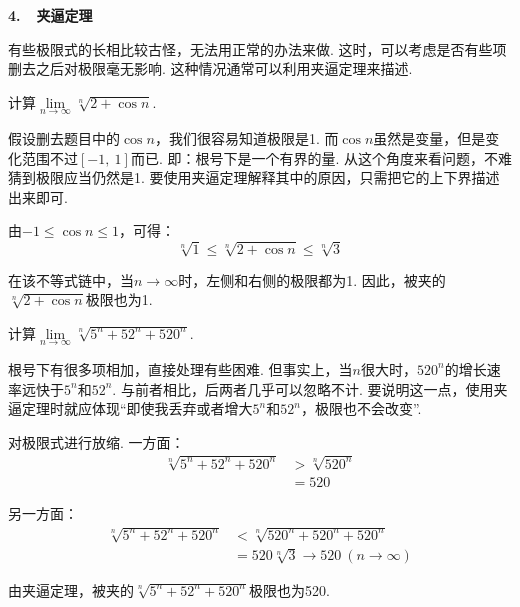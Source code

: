 \clearpage

\textbf{4.~~夹逼定理}\vspace{0.25em}

有些极限式的长相比较古怪，无法用正常的办法来做. 这时，可以考虑是否有些项删去之后对极限毫无影响. 这种情况通常可以利用夹逼定理来描述.

\begin{example}
\label{ex:ch01-15}
计算$\lim\limits_{n \to \infty}\sqrt[n]{2+\cos n}$.
\end{example}

\begin{analysis}
假设删去题目中的$\cos n$，我们很容易知道极限是1. 而$\cos n$虽然是变量，但是变化范围不过$[-1,~1]$而已. 即：根号下是一个有界的量. 从这个角度来看问题，不难猜到极限应当仍然是1. 要使用夹逼定理解释其中的原因，只需把它的上下界描述出来即可.
\end{analysis}

\begin{solution}
由$-1 \le \cos n \le 1$，可得：
$$
\sqrt[n]{1} \le \sqrt[n]{2+\cos n} \le \sqrt[n]{3}
$$ \par
在该不等式链中，当$n \to \infty$时，左侧和右侧的极限都为1. 因此，被夹的$\sqrt[n]{2+\cos n}$极限也为1.
\end{solution}

\begin{example}
\label{ex:ch01-16}
计算$\lim\limits_{n \to \infty}\sqrt[n]{5^{n}+52^{n}+520^{n}}$.
\end{example}

\begin{analysis}
根号下有很多项相加，直接处理有些困难. 但事实上，当$n$很大时，$520^{n}$的增长速率远快于$5^{n}$和$52^{n}$. 与前者相比，后两者几乎可以忽略不计. 要说明这一点，使用夹逼定理时就应体现“即使我丢弃或者增大$5^{n}$和$52^{n}$，极限也不会改变”.
\end{analysis}

\begin{solution}
对极限式进行放缩. 一方面：
\begin{equation}
    \begin{aligned}
        \sqrt[n]{5^{n}+52^{n}+520^{n}} &> \sqrt[n]{520^{n}} \\
        &= 520
        \nonumber
    \end{aligned}
\end{equation}\par
另一方面：
\begin{equation}
    \begin{aligned}
        \sqrt[n]{5^{n}+52^{n}+520^{n}} &< \sqrt[n]{520^{n}+520^{n}+520^{n}} \\
        &= 520\sqrt[n]{3} \to 520~(n \to \infty)
        \nonumber
    \end{aligned}
\end{equation}\par
由夹逼定理，被夹的$\sqrt[n]{5^{n}+52^{n}+520^{n}}$极限也为520.
\end{solution}

